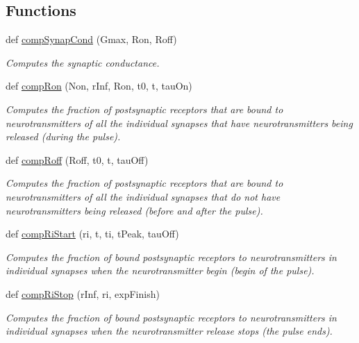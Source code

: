\subsection*{Functions}
\begin{DoxyCompactItemize}
\item 
def \hyperlink{namespace_synapse_a400340da82be44ca7d665a8e04cd8974}{comp\+Synap\+Cond} (Gmax, Ron, Roff)
\begin{DoxyCompactList}\small\item\em Computes the synaptic conductance. \end{DoxyCompactList}\item 
def \hyperlink{namespace_synapse_a685fe07b10fd8ff53778983666836dea}{comp\+Ron} (Non, r\+Inf, Ron, t0, t, tau\+On)
\begin{DoxyCompactList}\small\item\em Computes the fraction of postsynaptic receptors that are bound to neurotransmitters of all the individual synapses that have neurotransmitters being released (during the pulse). \end{DoxyCompactList}\item 
def \hyperlink{namespace_synapse_a946e8e8437009fba80f7d7ead8d1eb57}{comp\+Roff} (Roff, t0, t, tau\+Off)
\begin{DoxyCompactList}\small\item\em Computes the fraction of postsynaptic receptors that are bound to neurotransmitters of all the individual synapses that do not have neurotransmitters being released (before and after the pulse). \end{DoxyCompactList}\item 
def \hyperlink{namespace_synapse_a86ce19e1d63e7071f6315234ee4cb6b6}{comp\+Ri\+Start} (ri, t, ti, t\+Peak, tau\+Off)
\begin{DoxyCompactList}\small\item\em Computes the fraction of bound postsynaptic receptors to neurotransmitters in individual synapses when the neurotransmitter begin (begin of the pulse). \end{DoxyCompactList}\item 
def \hyperlink{namespace_synapse_ad8ba0d5cb97f96cf8f68a75efc924488}{comp\+Ri\+Stop} (r\+Inf, ri, exp\+Finish)
\begin{DoxyCompactList}\small\item\em Computes the fraction of bound postsynaptic receptors to neurotransmitters in individual synapses when the neurotransmitter release stops (the pulse ends). \end{DoxyCompactList}\item 

\end{DoxyCompactItemize}
